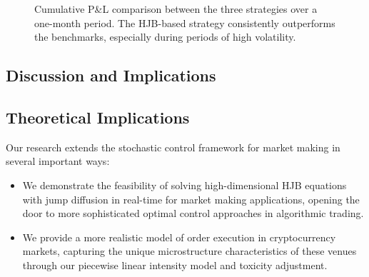 \documentclass[twocolumn,ieee]{arithmaxresearch}
\begin{document}
\begin{onecolumn}
\begin{onecolumn}
\begin{figure}[h]
\caption{Cumulative P\&L comparison between the three strategies over a one-month period. The HJB-based strategy consistently outperforms the benchmarks, especially during periods of high volatility.}
\label{fig:pnl_comparison}
\end{figure}
\end{onecolumn}
\begin{twocolumn}
\section{Discussion and Implications}

\subsection{Theoretical Implications}

Our research extends the stochastic control framework for market making in several important ways:

\begin{itemize}
    \item We demonstrate the feasibility of solving high-dimensional HJB equations with jump diffusion in real-time for market making applications, opening the door to more sophisticated optimal control approaches in algorithmic trading.
    
    \item We provide a more realistic model of order execution in cryptocurrency markets, capturing the unique microstructure characteristics of these venues through our piecewise linear intensity model and toxicity adjustment.
    

\end{itemize}
\end{twocolumn}
\end{onecolumn}
\end{document}
